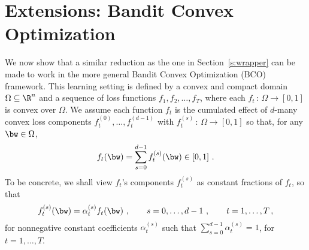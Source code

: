 
\newcommand{\fcomp}{f^{\circ}}
\newcommand{\scD}{\mathcal{D}}
\newcommand{\bb}{\boldsymbol{b}}
\newcommand{\B}{\field{B}}

\section{Extensions: Bandit Convex Optimization}\label{s:bco}
%
We now show that a similar reduction as the one in Section~\ref{s:wrapper} can be made to work in the more general Bandit Convex Optimization (BCO) framework. This learning setting is defined by a convex and compact domain $\Omega \subseteq \R^n$ and a sequence of loss functions $f_1, f_2, \ldots, f_T$, where each $f_t\,:\,\Omega \to [0,1]$ is convex over $\Omega$. We assume each function $f_t$ is the cumulated effect of $d$-many convex loss components $f_t^{(0)},\ldots, f_t^{(d-1)}$ with $f_t^{(s)}\,:\,\Omega \to [0,1]$ so that, for any $\bw \in \Omega$, 
%
\[
f_t(\bw) = \sum_{s=0}^{d-1} f_t^{(s)}(\bw) \in [0,1]~.
\]
To be concrete, we shall view $f_t$'s components $f_t^{(s)}$ as constant fractions of $f_t$, so that
\[
f_t^{(s)}(\bw) = \alpha^{(s)}_{t} f_t(\bw)~, \qquad s = 0,\ldots, d-1~, \qquad t = 1,\ldots, T\,,
\]
for nonnegative constant coefficients $\alpha^{(s)}_{t}$ such that $\sum_{s=0}^{d-1}\alpha^{(s)}_{t} =1$, for $t = 1, \ldots, T$.

